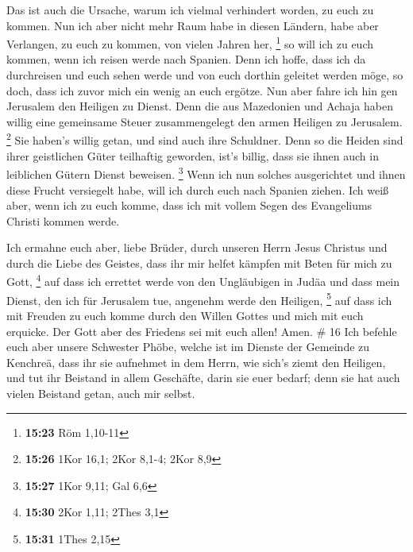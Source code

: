  Das ist auch die Ursache, warum ich vielmal verhindert
worden, zu euch zu kommen.  Nun ich aber nicht mehr Raum
habe in diesen Ländern, habe aber Verlangen, zu euch zu kommen, von
vielen Jahren her, \footnote{\textbf{15:23} Röm 1,10-11} 
so will ich zu euch kommen, wenn ich reisen werde nach Spanien. Denn ich
hoffe, dass ich da durchreisen und euch sehen werde und von euch dorthin
geleitet werden möge, so doch, dass ich zuvor mich ein wenig an euch
ergötze.  Nun aber fahre ich hin gen Jerusalem den
Heiligen zu Dienst.  Denn die aus Mazedonien und Achaja
haben willig eine gemeinsame Steuer zusammengelegt den armen Heiligen zu
Jerusalem. \footnote{\textbf{15:26} 1Kor 16,1; 2Kor 8,1-4; 2Kor 8,9}
 Sie haben's willig getan, und sind auch ihre Schuldner.
Denn so die Heiden sind ihrer geistlichen Güter teilhaftig geworden,
ist's billig, dass sie ihnen auch in leiblichen Gütern Dienst beweisen.
\footnote{\textbf{15:27} 1Kor 9,11; Gal 6,6}  Wenn ich
nun solches ausgerichtet und ihnen diese Frucht versiegelt habe, will
ich durch euch nach Spanien ziehen.  Ich weiß aber, wenn
ich zu euch komme, dass ich mit vollem Segen des Evangeliums Christi
kommen werde.

 Ich ermahne euch aber, liebe Brüder, durch unseren Herrn
Jesus Christus und durch die Liebe des Geistes, dass ihr mir helfet
kämpfen mit Beten für mich zu Gott, \footnote{\textbf{15:30} 2Kor 1,11;
  2Thes 3,1}  auf dass ich errettet werde von den
Ungläubigen in Judäa und dass mein Dienst, den ich für Jerusalem tue,
angenehm werde den Heiligen, \footnote{\textbf{15:31} 1Thes 2,15}
 auf dass ich mit Freuden zu euch komme durch den Willen
Gottes und mich mit euch erquicke.  Der Gott aber des
Friedens sei mit euch allen! Amen. \# 16  Ich befehle euch
aber unsere Schwester Phöbe, welche ist im Dienste der Gemeinde zu
Kenchreä,  dass ihr sie aufnehmet in dem Herrn, wie sich's
ziemt den Heiligen, und tut ihr Beistand in allem Geschäfte, darin sie
euer bedarf; denn sie hat auch vielen Beistand getan, auch mir selbst.

